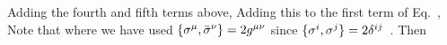 {	Adding the fourth and fifth terms above,
	Adding this to the first term of Eq.~,
	Note that
	where we have used $\{ \sigma^\mu, \bar{\sigma}^\nu \} = 2 g^{\mu \nu}$ since $\{ \sigma^i, \sigma^j \} = 2 \delta^{i j}$~\cite[p.~165]{Sakurai}.  Then
	
}
